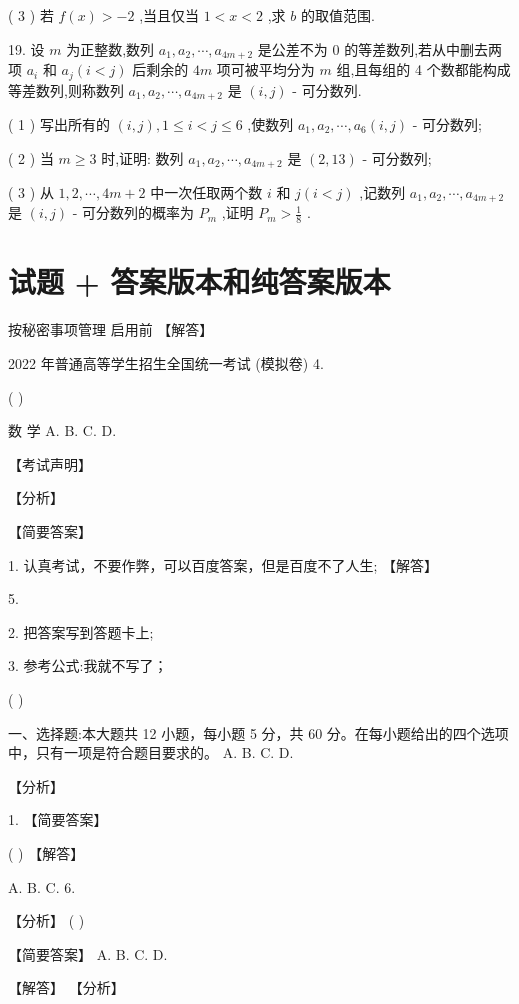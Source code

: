 \documentclass[10pt]{article}
\begin{document}
( 3 ) 若 \(f\left( x\right)  >  - 2\) ,当且仅当 \(1 < x < 2\) ,求 \(b\) 的取值范围.

19. 设 \(m\) 为正整数,数列 \({a}_{1},{a}_{2},\cdots ,{a}_{{4m} + 2}\) 是公差不为 0 的等差数列,若从中删去两项 \({a}_{i}\) 和 \({a}_{j}\left( {i < j}\right)\) 后剩余的 \({4m}\) 项可被平均分为 \(m\) 组,且每组的 4 个数都能构成等差数列,则称数列 \({a}_{1},{a}_{2},\cdots ,{a}_{{4m} + 2}\) 是 \(\left( {i,j}\right)\) - 可分数列.

( 1 ) 写出所有的 \(\left( {i,j}\right) ,1 \leq  i < j \leq  6\) ,使数列 \({a}_{1},{a}_{2},\cdots ,{a}_{6}\left( {i,j}\right)\) - 可分数列;

( 2 ) 当 \(m \geq  3\) 时,证明: 数列 \({a}_{1},{a}_{2},\cdots ,{a}_{{4m} + 2}\) 是 \(\left( {2,{13}}\right)\) - 可分数列;

( 3 ) 从 \(1,2,\cdots ,{4m} + 2\) 中一次任取两个数 \(i\) 和 \(j\left( {i < j}\right)\) ,记数列 \({a}_{1},{a}_{2},\cdots ,{a}_{{4m} + 2}\) 是 \(\left( {i,j}\right)\) - 可分数列的概率为 \({P}_{m}\) ,证明 \({P}_{m} > \frac{1}{8}\) .

\section*{试题 + 答案版本和纯答案版本}

按秘密事项管理  启用前 【解答】

2022 年普通高等学生招生全国统一考试 (模拟卷) 4.

( )

数 学 A. B. C. D.

【考试声明】

【分析】

【简要答案】

1. 认真考试，不要作弊，可以百度答案，但是百度不了人生; 【解答】

5.

2. 把答案写到答题卡上;

3. 参考公式:我就不写了；

( )

一、选择题:本大题共 12 小题，每小题 5 分，共 60 分。在每小题给出的四个选项中，只有一项是符合题目要求的。 A. B. C. D.

【分析】

1. 【简要答案】

( ) 【解答】

A. B. C. 6.

【分析】 ( )

【简要答案】 A. B. C. D.

【解答】 【分析】
\end{document}
